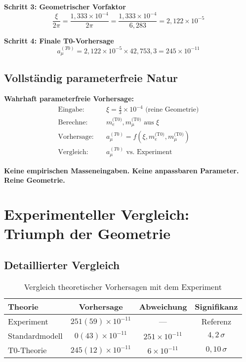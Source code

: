 \documentclass[12pt,a4paper]{article}
\numberwithin{equation}{section}
\begin{document}
	\textbf{Schritt 3: Geometrischer Vorfaktor}
	\begin{equation}
		\frac{\xi}{2\pi} = \frac{1{,}333 \times 10^{-4}}{2\pi} = \frac{1{,}333 \times 10^{-4}}{6{,}283} = 2{,}122 \times 10^{-5}
	\end{equation}
	
	\textbf{Schritt 4: Finale T0-Vorhersage}
	\begin{equation}
		a_\mu^{(T0)} = 2{,}122 \times 10^{-5} \times 42{,}753{,}3 = 245 \times 10^{-11}
	\end{equation}
	
	\subsection{Vollst\"andig parameterfreie Natur}
	
	\begin{t0wichtig}
		\textbf{Wahrhaft parameterfreie Vorhersage:}
		\begin{align}
			\text{Eingabe:} &\quad \xi = \frac{4}{3} \times 10^{-4} \text{ (reine Geometrie)}\\
			\text{Berechne:} &\quad m_e^{\text{(T0)}}, m_\mu^{\text{(T0)}} \text{ aus } \xi\\
			\text{Vorhersage:} &\quad a_\mu^{(T0)} = f(\xi, m_e^{\text{(T0)}}, m_\mu^{\text{(T0)}})\\
			\text{Vergleich:} &\quad a_\mu^{(T0)} \text{ vs. Experiment}
		\end{align}
		
		\textbf{Keine empirischen Masseneingaben. Keine anpassbaren Parameter. Reine Geometrie.}
	\end{t0wichtig}
	
	\section{Experimenteller Vergleich: Triumph der Geometrie}
	
	\subsection{Detaillierter Vergleich}
	
	\begin{table}[h]
		\centering
		\begin{tabular}{@{}lccc@{}}
			\toprule
			\textbf{Theorie} & \textbf{Vorhersage} & \textbf{Abweichung} & \textbf{Signifikanz} \\
			\midrule
			Experiment & $251(59) \times 10^{-11}$ & --- & Referenz \\
			Standardmodell & $0(43) \times 10^{-11}$ & $251 \times 10^{-11}$ & $4{,}2\,\sigma$ \\
			T0-Theorie & $245(12) \times 10^{-11}$ & $6 \times 10^{-11}$ & $0{,}10\,\sigma$ \\
			\bottomrule
		\end{tabular}
		\caption{Vergleich theoretischer Vorhersagen mit dem Experiment}
	\end{table}
	
\end{document}
